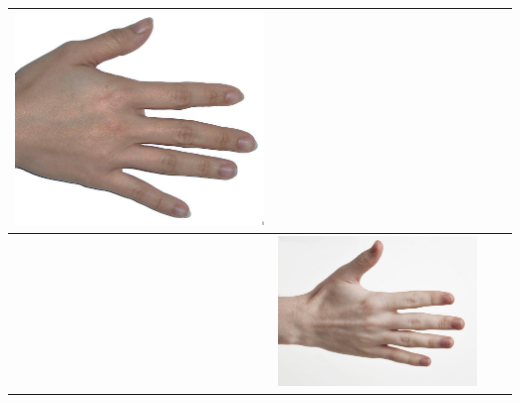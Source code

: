 \begin{longtable}{|N||c|c|c|}
\begin{minipage}{.29\textwidth}
    \includegraphics[width=\textwidth,height=\textheight,keepaspectratio]{../rc_test/outputs/20170516_proportional_test/hand_light_to_hand_pale.jpg}
  \end{minipage} \\
\hline  \label{row:prop_test_hand_pale_to_hand_dark} &
  \begin{minipage}{.29\textwidth}
    \includegraphics[width=\textwidth,height=\textheight,keepaspectratio]{../inputs/hand_pale.jpg}
  \end{minipage} & 
  \begin{minipage}{.29\textwidth}

\end{minipage}
\end{longtable}
